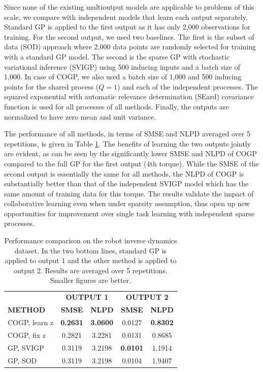 Since none of the existing multioutput models are applicable to problems of this scale, we compare with independent models that learn each output separately.
Standard GP is applied to the first output as it has only 2,000 observations for training.
For the second output, we used two baselines.
The first is the subset of data (SOD) approach where 2,000 data points are randomly selected for training with a standard GP model.
The second is the sparse GP with stochastic variational inference (SVIGP) using 500 inducing inputs and a batch size of 1,000.
In case of COGP, we also used a batch size of 1,000 and 500 inducing points for the shared process ($Q = 1$) and each of the independent processes.
The squared exponential with automatic relevance determination (SEard) covariance function is used for all processes of all methods.
Finally, the outputs are normalized to have zero mean and unit variance. 

The performance of all methods, in terms of SMSE and NLPD averaged over 5 repetitions, is given in Table \ref{tab:robotarm}.
The benefits of learning the two outputs jointly are evident, as can be seen by the significantly lower SMSE and NLPD of COGP compared to the full GP for the first output (4th torque).
While the SMSE of the second output is essentially the same for all methods, the NLPD of COGP is substantially better than that of the independent SVIGP model which has the same amount of training data for this torque.
The results validate the impact of collaborative learning even when under sparsity assumption, thus open up new opportunities for improvement over single task learning with independent sparse processes.

\begin{table}[t]
\caption{Performance comparison on the robot inverse dynamics dataset. In the two bottom lines, standard GP is applied to output 1 and the other method is applied to output 2. Results are averaged over 5 repetitions. Smaller figures are better.}
\label{tab:robotarm}
\begin{center}
\begin{tabular}{lcccc}
\toprule
& \multicolumn{2}{c}{\textbf{OUTPUT 1}} & \multicolumn{2}{c}{\textbf{OUTPUT 2}} \\ \cmidrule(r){2-5}
\textbf{METHOD} & \textbf{SMSE} & \textbf{NLPD} & \textbf{SMSE} & \textbf{NLPD}\\ 
 \midrule
COGP, learn z & \textbf{0.2631} & \textbf{3.0600} & 0.0127 & \textbf{0.8302} \\
COGP, fix z & 0.2821& 3.2281 & 0.0131 & 0.8685 \\
GP, SVIGP & 0.3119 & 3.2198 & \textbf{0.0101} & 1.1914 \\
GP, SOD & 0.3119 & 3.2198 & 0.0104 & 1.9407 \\
\bottomrule
\end{tabular}
\end{center}
\end{table}

